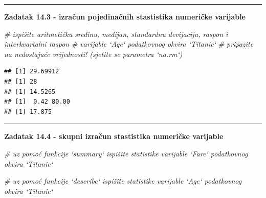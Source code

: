 \documentclass[]{book}
\newenvironment{Shaded}{\begin{snugshade}}{\end{snugshade}}
\newcommand{\KeywordTok}[1]{\textcolor[rgb]{0.13,0.29,0.53}{\textbf{#1}}}
\newcommand{\DataTypeTok}[1]{\textcolor[rgb]{0.13,0.29,0.53}{#1}}
\newcommand{\CommentTok}[1]{\textcolor[rgb]{0.56,0.35,0.01}{\textit{#1}}}
\newcommand{\OperatorTok}[1]{\textcolor[rgb]{0.81,0.36,0.00}{\textbf{#1}}}
\newcommand{\NormalTok}[1]{#1}
\theoremstyle{definition}
\theoremstyle{definition}
\theoremstyle{definition}
\theoremstyle{remark}
\begin{document}
\begin{center}\rule{0.5\linewidth}{\linethickness}\end{center}

\textbf{Zadatak 14.3 - izračun pojedinačnih stastistika numeričke
varijable}

\begin{Shaded}
\begin{Highlighting}[]
\CommentTok{# ispišite aritmetičku sredinu, medijan, standardnu devijaciju, raspon i interkvartalni raspon}
\CommentTok{# varijable `Age` podatkovnog okvira `Titanic`}
\CommentTok{# pripazite na nedostajuće vrijednosti!  (sjetite se parametra `na.rm`)}
\end{Highlighting}
\end{Shaded}

\begin{Shaded}
\end{Shaded}

\begin{verbatim}
## [1] 29.69912
## [1] 28
## [1] 14.5265
## [1]  0.42 80.00
## [1] 17.875
\end{verbatim}

\begin{center}\rule{0.5\linewidth}{\linethickness}\end{center}

\textbf{Zadatak 14.4 - skupni izračun stastistika numeričke varijable}

\begin{Shaded}
\begin{Highlighting}[]
\CommentTok{# uz pomoć funkcije `summary` ispišite statistike varijable `Fare` podatkovnog okvira `Titanic`}

\CommentTok{# uz pomoć funkcije `describe` ispišite statistike varijable `Age` podatkovnog okvira `Titanic`}
\end{Highlighting}
\end{Shaded}
\end{document}
